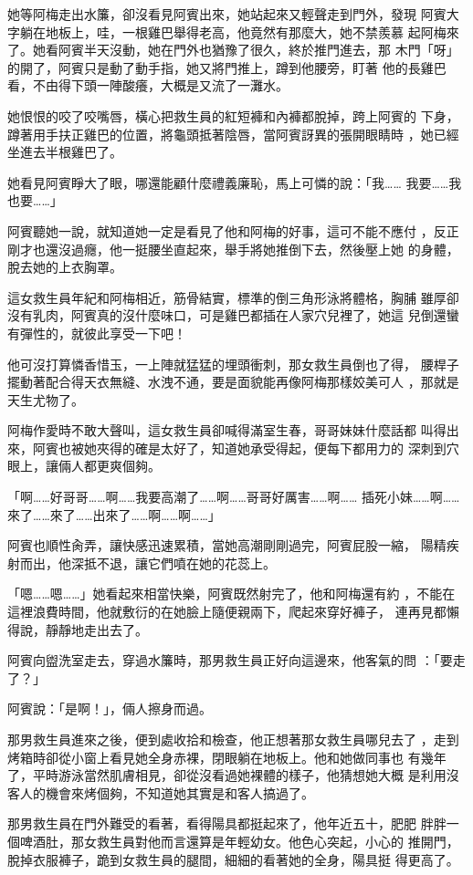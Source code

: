 她等阿梅走出水簾，卻沒看見阿賓出來，她站起來又輕聲走到門外，發現
阿賓大字躺在地板上，哇，一根雞巴舉得老高，他竟然有那麼大，她不禁羨慕
起阿梅來了。她看阿賓半天沒動，她在門外也猶豫了很久，終於推門進去，那
木門「呀」的開了，阿賓只是動了動手指，她又將門推上，蹲到他腰旁，盯著
他的長雞巴看，不由得下頭一陣酸癢，大概是又流了一灘水。

她恨恨的咬了咬嘴唇，橫心把救生員的紅短褲和內褲都脫掉，跨上阿賓的
下身，蹲著用手扶正雞巴的位置，將龜頭抵著陰唇，當阿賓訝異的張開眼睛時
，她已經坐進去半根雞巴了。

她看見阿賓睜大了眼，哪還能顧什麼禮義廉恥，馬上可憐的說：「我……
我要……我也要……」

阿賓聽她一說，就知道她一定是看見了他和阿梅的好事，這可不能不應付
，反正剛才也還沒過癮，他一挺腰坐直起來，舉手將她推倒下去，然後壓上她
的身體，脫去她的上衣胸罩。

這女救生員年紀和阿梅相近，筋骨結實，標準的倒三角形泳將體格，胸脯
雖厚卻沒有乳肉，阿賓真的沒什麼味口，可是雞巴都插在人家穴兒裡了，她這
兒倒還蠻有彈性的，就彼此享受一下吧！

他可沒打算憐香惜玉，一上陣就猛猛的埋頭衝刺，那女救生員倒也了得，
腰桿子擺動著配合得天衣無縫、水洩不通，要是面貌能再像阿梅那樣姣美可人
，那就是天生尤物了。

阿梅作愛時不敢大聲叫，這女救生員卻喊得滿室生春，哥哥妹妹什麼話都
叫得出來，阿賓也被她夾得的確是太好了，知道她承受得起，便每下都用力的
深刺到穴眼上，讓倆人都更爽個夠。

「啊……好哥哥……啊……我要高潮了……啊……哥哥好厲害……啊……
插死小妹……啊……來了……來了……出來了……啊……啊……」

阿賓也順性肏弄，讓快感迅速累積，當她高潮剛剛過完，阿賓屁股一縮，
陽精疾射而出，他深抵不退，讓它們噴在她的花蕊上。

「嗯……嗯……」她看起來相當快樂，阿賓既然射完了，他和阿梅還有約
，不能在這裡浪費時間，他就敷衍的在她臉上隨便親兩下，爬起來穿好褲子，
連再見都懶得說，靜靜地走出去了。

阿賓向盥洗室走去，穿過水簾時，那男救生員正好向這邊來，他客氣的問
：「要走了？」

阿賓說：「是啊！」，倆人擦身而過。

那男救生員進來之後，便到處收拾和檢查，他正想著那女救生員哪兒去了
，走到烤箱時卻從小窗上看見她全身赤裸，閉眼躺在地板上。他和她做同事也
有幾年了，平時游泳當然肌膚相見，卻從沒看過她裸體的樣子，他猜想她大概
是利用沒客人的機會來烤個夠，不知道她其實是和客人搞過了。

那男救生員在門外難受的看著，看得陽具都挺起來了，他年近五十，肥肥
胖胖一個啤酒肚，那女救生員對他而言還算是年輕幼女。他色心突起，小心的
推開門，脫掉衣服褲子，跪到女救生員的腿間，細細的看著她的全身，陽具挺
得更高了。

